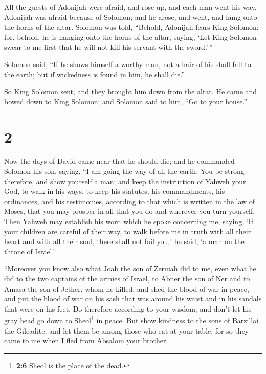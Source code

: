  All the guests of Adonijah were afraid, and rose up, and
each man went his way.  Adonijah was afraid because of
Solomon; and he arose, and went, and hung onto the horns of the altar.
 Solomon was told, ``Behold, Adonijah fears King Solomon;
for, behold, he is hanging onto the horns of the altar, saying, `Let
King Solomon swear to me first that he will not kill his servant with
the sword.'\,''

 Solomon said, ``If he shows himself a worthy man, not a
hair of his shall fall to the earth; but if wickedness is found in him,
he shall die.''

 So King Solomon sent, and they brought him down from the
altar. He came and bowed down to King Solomon; and Solomon said to him,
``Go to your house.''

\hypertarget{section-1}{%
\section{2}\label{section-1}}

 Now the days of David came near that he should die; and
he commanded Solomon his son, saying,  ``I am going the
way of all the earth. You be strong therefore, and show yourself a man;
 and keep the instruction of Yahweh your God, to walk in
his ways, to keep his statutes, his commandments, his ordinances, and
his testimonies, according to that which is written in the law of Moses,
that you may prosper in all that you do and wherever you turn yourself.
 Then Yahweh may establish his word which he spoke
concerning me, saying, `If your children are careful of their way, to
walk before me in truth with all their heart and with all their soul,
there shall not fail you,' he said, `a man on the throne of Israel.'

 ``Moreover you know also what Joab the son of Zeruiah did
to me, even what he did to the two captains of the armies of Israel, to
Abner the son of Ner and to Amasa the son of Jether, whom he killed, and
shed the blood of war in peace, and put the blood of war on his sash
that was around his waist and in his sandals that were on his feet.
 Do therefore according to your wisdom, and don't let his
gray head go down to Sheol\footnote{\textbf{2:6} Sheol is the place of
  the dead.} in peace.  But show kindness to the sons of
Barzillai the Gileadite, and let them be among those who eat at your
table; for so they came to me when I fled from Absalom your brother.

